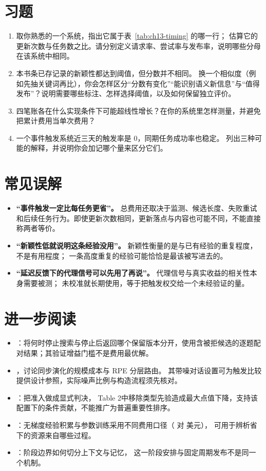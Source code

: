 \section*{习题}
\begin{enumerate}[label=13-\arabic*.,ref=13-\arabic*]
  \item\label{ex:ch13-1} 取你熟悉的一个系统，指出它属于表~\ref{tab:ch13-timing} 的哪一行；
        估算它的更新次数与任务数之比。请分别定义请求率、尝试率与发布率，说明哪些分母在该系统中相同。
  \item\label{ex:ch13-2} 本书条已存记录的新颖性都达到阈值，但分数并不相同。
        换一个相似度（例如先抽关键词再比），你会怎样区分“分数有变化”“能识别语义新信息”与“值得发布”？说明需要哪些标注、怎样选择阈值，以及如何保留独立评价。
  \item\label{ex:ch13-3} 四笔账各在什么实现条件下可能超线性增长？在你的系统里怎样测量，并避免把累计费用当单次费用？
  \item\label{ex:ch13-4} 一个事件触发系统近三天的触发率是 0，同期任务成功率也稳定。
        列出三种可能的解释，并说明你会加记哪个量来区分它们。
\end{enumerate}

\section*{常见误解}
\begin{itemize}
  \item \textbf{“事件触发一定比每任务更省”。}
        总费用还取决于监测、候选长度、失败重试和后续任务行为。即使更新次数相同，更新落点与内容也可能不同，不能直接称两者等价。
  \item \textbf{“新颖性低就说明这条经验没用”。}
        新颖性衡量的是与已有经验的重复程度，不是有用程度；
        一条高度重复的经验可能恰恰是最该被写进去的。
  \item \textbf{“延迟反馈下的代理信号可以先用了再说”。}
        代理信号与真实收益的相关性本身需要被测；
        未校准就长期使用，等于把触发权交给一个未经验证的量。
\end{itemize}

\section*{进一步阅读}
\begin{itemize}
  \item \cite{enough-enough-2610}：将何时停止搜索与停止后返回哪个保留版本分开，使用含被拒候选的逐题配对结果；其验证增益门槛不是费用最优解。
  \item \cite{dmem-2603}，讨论同步演化的规模成本与 RPE 分层路由。
        其带噪对话设置可为触发比较提供设计参照，实际噪声比例与构造流程须先核对。
  \item \cite{amac-2603}：把准入做成显式判决，
        Table 2中移除类型先验造成最大点值下降，支持该配置下的条件贡献，不能推广为普遍重要性排序。
  \item \cite{jitrl-2601}：无梯度经验积累与参数训练采用不同费用口径（ 对  美元），
        可用于辨析省下的资源来自哪些过程。
  \item \cite{agemem-2601}：阶段边界如何切分上下文与记忆，
        这一阶段安排与固定周期发布不是同一个机制。
\end{itemize}
